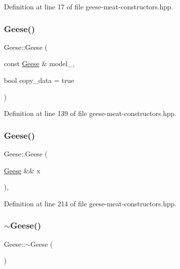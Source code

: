Definition at line 17 of file geese-\/meat-\/constructors.\+hpp.

\mbox{\label{class_geese_acb709c40f1b4d3c7fd8fb06c4ea2627c}} 
\subsubsection{\texorpdfstring{Geese()}{Geese()}\hspace{0.1cm}{\footnotesize\ttfamily [3/4]}}
{\footnotesize\ttfamily Geese\+::\+Geese (\begin{DoxyParamCaption}\item[{const \hyperlink{class_geese}{Geese} \&}]{model\+\_\+,  }\item[{bool}]{copy\+\_\+data = {\ttfamily true} }\end{DoxyParamCaption})\hspace{0.3cm}{\ttfamily [inline]}}



Definition at line 139 of file geese-\/meat-\/constructors.\+hpp.

\mbox{\label{class_geese_a3f80a16330da3af4a5cf250cbf79a6a4}} 
\subsubsection{\texorpdfstring{Geese()}{Geese()}\hspace{0.1cm}{\footnotesize\ttfamily [4/4]}}
{\footnotesize\ttfamily Geese\+::\+Geese (\begin{DoxyParamCaption}\item[{\hyperlink{class_geese}{Geese} \&\&}]{x }\end{DoxyParamCaption})\hspace{0.3cm}{\ttfamily [inline]}, {\ttfamily [noexcept]}}



Definition at line 214 of file geese-\/meat-\/constructors.\+hpp.

\mbox{\label{class_geese_a8b665d6faea65caacbb00feea98d53b0}} 
\subsubsection{\texorpdfstring{$\sim$\+Geese()}{~Geese()}}
{\footnotesize\ttfamily Geese\+::$\sim$\+Geese (\begin{DoxyParamCaption}{ }\end{DoxyParamCaption})\hspace{0.3cm}{\ttfamily [inline]}}



